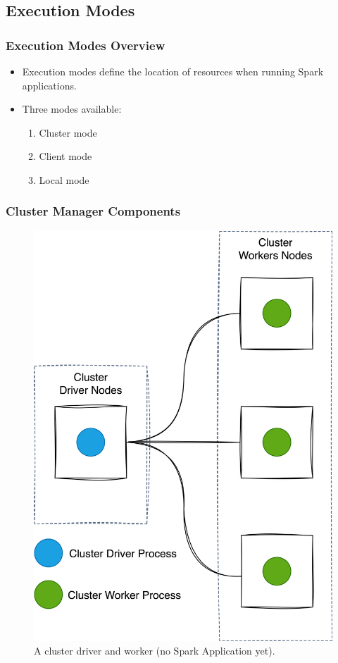 
\subsection{Execution Modes}\label{subsec:deployment-mode}
\begin{frame}
    \frametitle{Execution Modes Overview}
    \begin{itemize}
        \item Execution modes define the location of resources when running Spark applications.
        \item Three modes available:
        \begin{enumerate}
            \item Cluster mode
            \item Client mode
            \item Local mode
        \end{enumerate}
    \end{itemize}
\end{frame}

\begin{frame}
    \frametitle{Cluster Manager Components}
    \begin{figure}
        \includegraphics[width=\textwidth,height=.7\textheight,keepaspectratio]{./Figures/chapter-04/cluster_manager_processes}
        \caption{A cluster driver and worker (no Spark Application yet).}
    \end{figure}
\end{frame}

